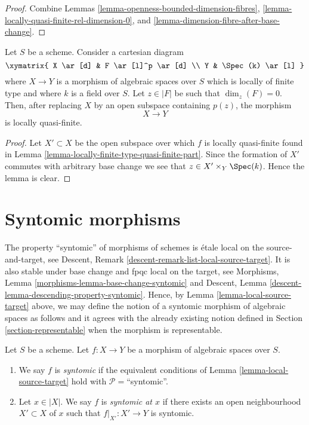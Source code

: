 \begin{proof}
Combine
Lemmas \ref{lemma-openness-bounded-dimension-fibres},
\ref{lemma-locally-quasi-finite-rel-dimension-0}, and
\ref{lemma-dimension-fibre-after-base-change}.
\end{proof}

\begin{lemma}
\label{lemma-quasi-finite-at-point}
Let $S$ be a scheme. Consider a cartesian diagram
$$
\xymatrix{
X \ar[d] & F \ar[l]^p \ar[d] \\
Y & \Spec(k) \ar[l]
}
$$
where $X \to Y$ is a morphism of algebraic spaces over $S$ which is
locally of finite type and where $k$ is a field over $S$.
Let $z \in |F|$ be such that $\dim_z(F) = 0$. Then, after replacing $X$
by an open subspace containing $p(z)$, the morphism
$$
X \longrightarrow Y
$$
is locally quasi-finite.
\end{lemma}

\begin{proof}
Let $X' \subset X$ be the open subspace over which $f$ is locally quasi-finite
found in
Lemma \ref{lemma-locally-finite-type-quasi-finite-part}.
Since the formation of $X'$ commutes with arbitrary base change we see
that $z \in X' \times_Y \Spec(k)$. Hence the lemma is clear.
\end{proof}






\section{Syntomic morphisms}
\label{section-syntomic}

\noindent
The property ``syntomic'' of morphisms of schemes is
\'etale local on the source-and-target, see
Descent, Remark \ref{descent-remark-list-local-source-target}.
It is also stable under base change and fpqc local on the target, see
Morphisms, Lemma \ref{morphisms-lemma-base-change-syntomic} and
Descent, Lemma \ref{descent-lemma-descending-property-syntomic}.
Hence, by
Lemma \ref{lemma-local-source-target}
above, we may define the notion of a syntomic morphism of algebraic spaces as
follows and it agrees with the already existing notion defined in
Section \ref{section-representable}
when the morphism is representable.

\begin{definition}
\label{definition-syntomic}
Let $S$ be a scheme.
Let $f : X \to Y$ be a morphism of algebraic spaces over $S$.
\begin{enumerate}
\item We say $f$ is {\it syntomic} if the equivalent conditions of
Lemma \ref{lemma-local-source-target}
hold with $\mathcal{P} =$``syntomic''.
\item Let $x \in |X|$. We say $f$ is {\it syntomic at $x$} if
there exists an open neighbourhood $X' \subset X$ of $x$ such
that $f|_{X'} : X' \to Y$ is syntomic.
\end{enumerate}
\end{definition}

